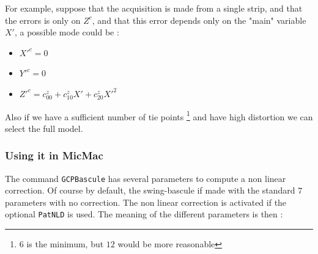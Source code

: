 For example, suppose that the acquisition is made from a single strip, and
that the errors is only on $Z^c$,  and that this error depends only on  the
"main" variable $X'$, a possible mode could be :

\begin{itemize}
   \item $X'^c = 0$
   \item $Y'^c = 0$
   \item $Z'^c =  c^z_{00} + c^z_{10} X' + c^z_{20} X'^2$
\end{itemize}

Also if we have a sufficient number of tie points \footnote{$6$ is the minimum, but $12$ would be more
reasonable} and have high distortion we can select the full model.


\subsubsection{Using it in MicMac}

The command {\tt GCPBascule} has several parameters to compute a non linear
correction. Of course by default, the swing-bascule if made with the standard $7$ parameters
with no correction. The non linear correction is activated if the optional {\tt PatNLD} is
used. The meaning of the different parameters is then :


